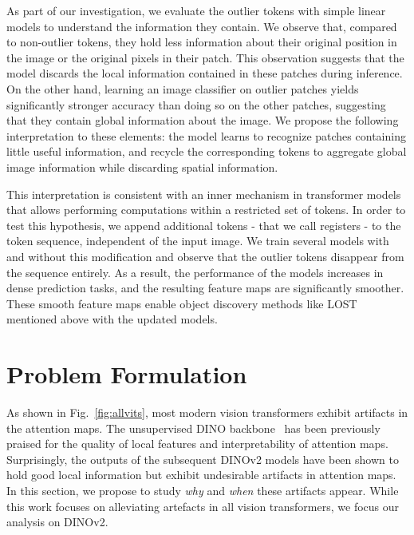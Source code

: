 \documentclass{article} \usepackage{iclr2024_conference,times}
\newcommand{\new}[1]{{#1}}
\newcommand{\old}[1]{}
\begin{document}
\old{Additionally,} \new{As part of our investigation,} we evaluate the outlier tokens with simple linear models to \old{clarify}\new{understand} the information they contain.
We observe that, compared to non-outlier tokens, they hold less information about their original position in the image or the original pixels in their patch.
This observation suggests that the model discards the local information contained in these patches during inference. 
On the \old{contrary}\new{other hand}, learning an image classifier on outlier patches yields significantly stronger accuracy than doing so on the other patches, \new{suggesting that}
\old{This experiment indicates that} they contain global information about the image. 
We propose the following interpretation to these elements:
the model learns to recognize \old{tokens}\new{patches} containing little useful information, \old{discard this information by overwriting with higher-norm vectors,}and recycle \old{these}\new{the corresponding} tokens to aggregate global image information \new{while discarding spatial information}.

This interpretation is consistent with an inner mechanism in transformer models that allows performing computations within a restricted set of tokens. 
In order to test this hypothesis, we append additional tokens - that we call registers - to the token sequence, independent of the input image. 
We train several models with and without this modification and observe that the outlier tokens disappear from the sequence entirely. 
As a result, the performance of the models increases in dense prediction tasks, and the resulting feature maps are significantly smoother.
These smooth feature maps enable object discovery methods like LOST mentioned above with the updated models.

 



\section{Problem Formulation}\label{sec:problem}
As shown in Fig.~\ref{fig:allvits}, most modern vision transformers exhibit artifacts in the attention maps.
The unsupervised DINO backbone~\new{\citep{caron2021emerging}}\old{\cite{caron2021emerging}} has been previously praised for the quality of local features and interpretability of attention maps.
Surprisingly, the outputs of the subsequent DINOv2 models have been shown to hold good local information but exhibit undesirable artifacts in attention maps.
In this section, we propose to study \textit{why} and \textit{when} these artifacts appear.
While this work focuses on alleviating artefacts in all vision transformers, we focus our analysis on DINOv2.
\end{document}
